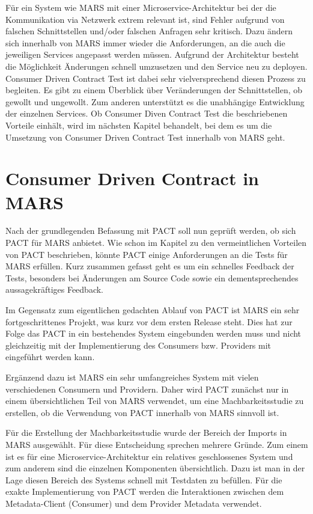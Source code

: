 \documentclass{llncs}
\begin{document}
Für ein System wie MARS mit einer Microservice-Architektur bei der die Kommunikation via Netzwerk extrem relevant ist, sind Fehler aufgrund von falschen Schnittstellen und/oder falschen Anfragen sehr kritisch. Dazu ändern sich innerhalb von MARS immer wieder die Anforderungen, an die auch die jeweiligen Services angepasst werden müssen. Aufgrund der Architektur besteht die Möglichkeit Änderungen schnell umzusetzen und den Service neu zu deployen. Consumer Driven Contract Test ist dabei sehr vielversprechend diesen Prozess zu begleiten. Es gibt zu einem Überblick über Veränderungen der Schnittstellen, ob gewollt und ungewollt. Zum anderen unterstützt es die unabhängige Entwicklung der einzelnen Services. Ob Consumer Diven Contract Test die beschriebenen Vorteile einhält, wird im nächsten Kapitel behandelt, bei dem es um die Umsetzung von Consumer Driven Contract Test innerhalb von MARS geht.

\section{Consumer Driven Contract in MARS}
Nach der grundlegenden Befassung mit PACT soll nun geprüft werden, ob sich PACT für MARS anbietet. Wie schon im Kapitel zu den vermeintlichen Vorteilen von PACT beschrieben, könnte PACT einige Anforderungen an die Tests für MARS erfüllen. Kurz zusammen gefasst geht es um ein schnelles Feedback der Tests, besonders bei Änderungen am Source Code sowie ein dementsprechendes aussagekräftiges Feedback.

Im Gegensatz zum eigentlichen gedachten Ablauf von PACT ist MARS ein sehr fortgeschrittenes Projekt, was kurz vor dem ersten Release steht. Dies hat zur Folge das PACT in ein bestehendes System eingebunden werden muss und nicht gleichzeitig mit der Implementierung des Consumers bzw. Providers mit eingeführt werden kann.

Ergänzend dazu ist MARS ein sehr umfangreiches System mit vielen verschiedenen Consumern und Providern. Daher wird PACT zunächst nur in einem übersichtlichen Teil von MARS verwendet, um eine Machbarkeitsstudie zu erstellen, ob die Verwendung von PACT innerhalb von MARS sinnvoll ist.

Für die Erstellung der Machbarkeitsstudie wurde der Bereich der Imports in MARS ausgewählt. Für diese Entscheidung sprechen mehrere Gründe. Zum einem ist es für eine Microservice-Architektur ein relatives geschlossenes System und zum anderem sind die einzelnen Komponenten übersichtlich. Dazu ist man in der Lage diesen Bereich des Systems schnell mit Testdaten zu befüllen. Für die exakte Implementierung von PACT werden die Interaktionen zwischen dem Metadata-Client (Consumer) und dem Provider Metadata verwendet.
\end{document}
